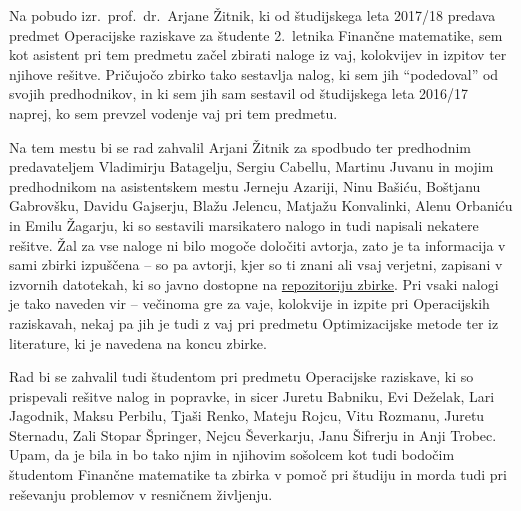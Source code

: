 Na pobudo izr.~prof.~dr.~Arjane Žitnik,
ki od študijskega leta 2017/18 predava predmet Operacijske raziskave
za študente 2.~letnika Finančne matematike,
sem kot asistent pri tem predmetu začel zbirati
naloge iz vaj, kolokvijev in izpitov ter njihove rešitve.
Pričujočo zbirko tako sestavlja \thetotal{} nalog,
ki sem jih ``podedoval'' od svojih predhodnikov,
in ki sem jih sam sestavil od študijskega leta 2016/17 naprej,
ko sem prevzel vodenje vaj pri tem predmetu.

Na tem mestu bi se rad zahvalil Arjani Žitnik za spodbudo
ter predhodnim predavateljem Vladimirju Batagelju, Sergiu Cabellu, Martinu Juvanu
in mojim predhodnikom na asistentskem mestu
Jerneju Azariji, Ninu Bašiću, Boštjanu Gabrovšku, Davidu Gajserju,
Blažu Jelencu, Matjažu Konvalinki, Alenu Orbaniću in Emilu Žagarju,
ki so sestavili marsikatero nalogo in tudi napisali nekatere rešitve.
Žal za vse naloge ni bilo mogoče določiti avtorja,
zato je ta informacija v sami zbirki izpuščena
-- so pa avtorji, kjer so ti znani ali vsaj verjetni,
zapisani v izvornih datotekah,
ki so javno dostopne na
\href{https://github.com/jaanos/or-zbirka}{repozitoriju zbirke}.
Pri vsaki nalogi je tako naveden vir
-- večinoma gre za vaje, kolokvije in izpite pri Operacijskih raziskavah,
nekaj pa jih je tudi z vaj pri predmetu Optimizacijske metode
ter iz literature, ki je navedena na koncu zbirke.

Rad bi se zahvalil tudi študentom pri predmetu Operacijske raziskave,
ki so prispevali rešitve nalog in popravke,
in sicer Juretu Babniku, Evi Deželak, Lari Jagodnik, Maksu Perbilu, Tjaši Renko,
Mateju Rojcu, Vitu Rozmanu, Juretu Sternadu, Zali Stopar Špringer,
Nejcu Ševerkarju, Janu Šifrerju in Anji Trobec.
Upam,
da je bila in bo tako njim in njihovim sošolcem
kot tudi bodočim študentom Finančne matematike
ta zbirka v pomoč pri študiju
in morda tudi pri reševanju problemov v resničnem življenju.
